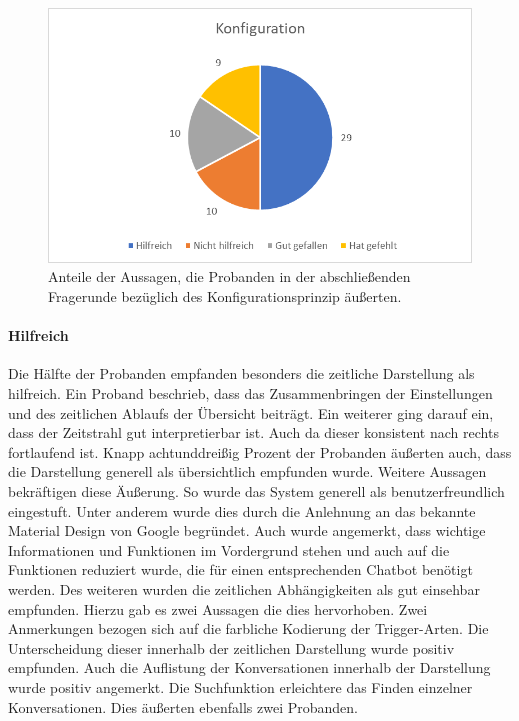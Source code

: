 \begin{figure}[h]
\centering
\includegraphics[width=1\textwidth]{pictures/diagramme/aussagenkonfig}
\caption{Anteile der Aussagen, die Probanden in der abschließenden Fragerunde bezüglich des Konfigurationsprinzip äußerten.}
\label{aussagenkonfig}
\end{figure}


\paragraph{Hilfreich}Die Hälfte der Probanden empfanden besonders die zeitliche Darstellung als hilfreich. Ein Proband beschrieb, dass das Zusammenbringen der Einstellungen und des zeitlichen Ablaufs der Übersicht beiträgt. Ein weiterer ging darauf ein, dass der Zeitstrahl gut interpretierbar ist. Auch da dieser konsistent nach rechts fortlaufend ist. Knapp achtunddreißig Prozent der Probanden äußerten auch, dass die Darstellung generell als übersichtlich empfunden wurde. Weitere Aussagen bekräftigen diese Äußerung. So wurde das System generell als benutzerfreundlich eingestuft. Unter anderem wurde dies durch die Anlehnung an das bekannte Material Design von Google begründet. Auch wurde angemerkt, dass wichtige Informationen und Funktionen im Vordergrund stehen und auch auf die Funktionen reduziert wurde, die für einen entsprechenden Chatbot benötigt werden. Des weiteren wurden die zeitlichen Abhängigkeiten als gut einsehbar empfunden. Hierzu gab es zwei Aussagen die dies hervorhoben. Zwei Anmerkungen bezogen sich auf die farbliche Kodierung der Trigger-Arten. Die Unterscheidung dieser innerhalb der zeitlichen Darstellung wurde positiv empfunden. Auch die Auflistung der Konversationen innerhalb der Darstellung wurde positiv angemerkt. Die Suchfunktion erleichtere das Finden einzelner Konversationen. Dies äußerten ebenfalls zwei Probanden.



